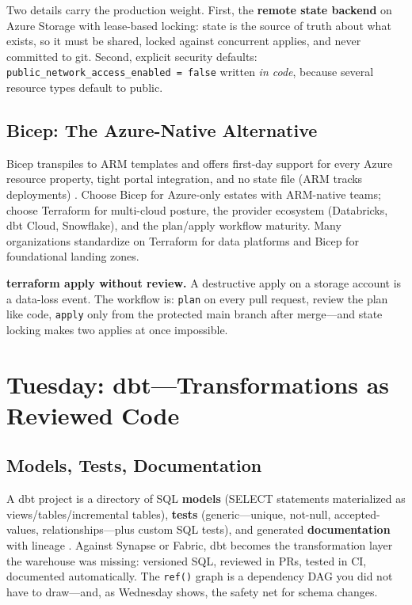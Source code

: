 Two details carry the production weight. First, the \textbf{remote state backend} on Azure Storage with lease-based locking: state is the source of truth about what exists, so it must be shared, locked against concurrent applies, and never committed to git. Second, explicit security defaults: \texttt{public\_network\_access\_enabled = false} written \emph{in code}, because several resource types default to public.

\subsection{Bicep: The Azure-Native Alternative}
Bicep transpiles to ARM templates and offers first-day support for every Azure resource property, tight portal integration, and no state file (ARM tracks deployments) \cite{microsoft2025bicep}. Choose Bicep for Azure-only estates with ARM-native teams; choose Terraform for multi-cloud posture, the provider ecosystem (Databricks, dbt Cloud, Snowflake), and the plan/apply workflow maturity. Many organizations standardize on Terraform for data platforms and Bicep for foundational landing zones.

\begin{pitfall}
\textbf{terraform apply without review.} A destructive apply on a storage account is a data-loss event. The workflow is: \texttt{plan} on every pull request, review the plan like code, \texttt{apply} only from the protected main branch after merge---and state locking makes two applies at once impossible.
\end{pitfall}

\section{Tuesday: dbt---Transformations as Reviewed Code}

\subsection{Models, Tests, Documentation}
A dbt project is a directory of SQL \textbf{models} (SELECT statements materialized as views/tables/incremental tables), \textbf{tests} (generic---unique, not-null, accepted-values, relationships---plus custom SQL tests), and generated \textbf{documentation} with lineage \cite{dbtlabs2025core}. Against Synapse or Fabric, dbt becomes the transformation layer the warehouse was missing: versioned SQL, reviewed in PRs, tested in CI, documented automatically. The \texttt{ref()} graph is a dependency DAG you did not have to draw---and, as Wednesday shows, the safety net for schema changes.

